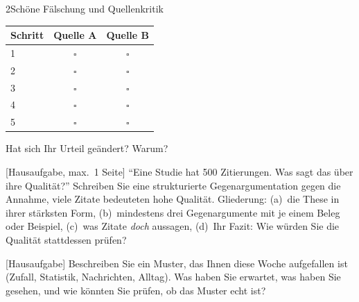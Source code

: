 \begin{uebungsblattb}{2}{Schöne Fälschung und Quellenkritik}
\begin{center}
\renewcommand{\arraystretch}{1.6}
\begin{tabular}{|p{}|c|c|}
\hline
\textbf{Schritt} & \textbf{Quelle A} & \textbf{Quelle B} \\
\hline
1 \rule{0pt}{7mm} & $\square$ & $\square$ \\ \hline
2 \rule{0pt}{7mm} & $\square$ & $\square$ \\ \hline
3 \rule{0pt}{7mm} & $\square$ & $\square$ \\ \hline
4 \rule{0pt}{7mm} & $\square$ & $\square$ \\ \hline
5 \rule{0pt}{7mm} & $\square$ & $\square$ \\ \hline
\end{tabular}
\end{center}
Hat sich Ihr Urteil geändert? Warum?

[Hausaufgabe, max.\ 1 Seite]
\enquote{Eine Studie hat 500 Zitierungen. Was sagt das über ihre
Qualität?} Schreiben Sie eine strukturierte Gegenargumentation gegen die
Annahme, viele Zitate bedeuteten hohe Qualität. Gliederung: (a)~die
These in ihrer stärksten Form, (b)~mindestens drei Gegenargumente mit je
einem Beleg oder Beispiel, (c)~was Zitate \emph{doch} aussagen, (d)~Ihr
Fazit: Wie würden Sie die Qualität stattdessen prüfen?

[Hausaufgabe]
Beschreiben Sie ein Muster, das Ihnen diese Woche aufgefallen ist
(Zufall, Statistik, Nachrichten, Alltag). Was haben Sie erwartet, was
haben Sie gesehen, und wie könnten Sie prüfen, ob das Muster echt ist?


\end{uebungsblattb}
